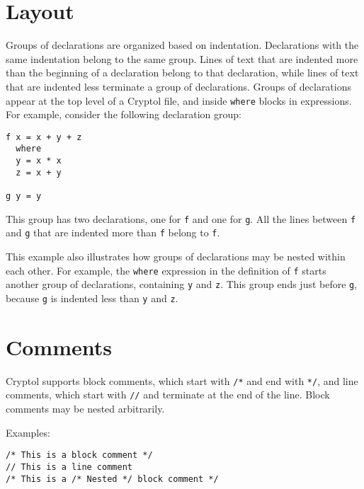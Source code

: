 
\hypertarget{layout}{%
\section{Layout}\label{layout}}

Groups of declarations are organized based on indentation. Declarations
with the same indentation belong to the same group. Lines of text that
are indented more than the beginning of a declaration belong to that
declaration, while lines of text that are indented less terminate a
group of declarations. Groups of declarations appear at the top level of
a Cryptol file, and inside \texttt{where} blocks in expressions. For
example, consider the following declaration group:

\begin{verbatim}
f x = x + y + z
  where
  y = x * x
  z = x + y

g y = y
\end{verbatim}

This group has two declarations, one for \texttt{f} and one for
\texttt{g}. All the lines between \texttt{f} and \texttt{g} that are
indented more than \texttt{f} belong to \texttt{f}.

This example also illustrates how groups of declarations may be nested
within each other. For example, the \texttt{where} expression in the
definition of \texttt{f} starts another group of declarations,
containing \texttt{y} and \texttt{z}. This group ends just before
\texttt{g}, because \texttt{g} is indented less than \texttt{y} and
\texttt{z}.

\hypertarget{comments}{%
\section{Comments}\label{comments}}

Cryptol supports block comments, which start with \texttt{/*} and end
with \texttt{*/}, and line comments, which start with \texttt{//} and
terminate at the end of the line. Block comments may be nested
arbitrarily.

Examples:

\begin{verbatim}
/* This is a block comment */
// This is a line comment
/* This is a /* Nested */ block comment */
\end{verbatim}

